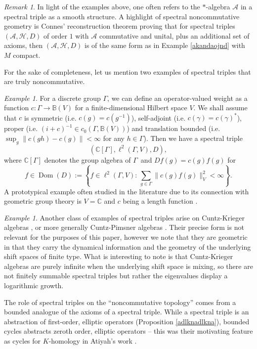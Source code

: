 \documentclass[a4paper,reqno]{amsart}
\numberwithin{equation}{section}
\def\Dom{\operatorname{Dom}}
\def\sup{\operatorname{sup}}
\def\C{\mathbb{C}}
\theoremstyle{definition}
\theoremstyle{remark}
\newtheorem{remark}[thm]{Remark}
\newtheorem{example}[thm]{Example}
\begin{document}
\begin{remark}
In light of the examples above, one often refers to the $*$-algebra $\mathcal{A}$ in a spectral triple as a smooth structure. A highlight of spectral noncommutative geometry is Connes' reconstruction theorem \cite{connesreconstr,renniereconst} proving that for spectral triples $(\mathcal{A},\mathcal{H},D)$ of order $1$ with $\mathcal{A}$ commutative and unital, plus an additional set of axioms, then $(\mathcal{A},\mathcal{H},D)$ is of the same form as in Example \ref{akandaojnd} with $M$ compact.
\end{remark}


For the sake of completeness, let us mention two examples of spectral triples that are truly noncommutative. 




\begin{example}
For a discrete group $\Gamma$, we can define an operator-valued weight as a function $c:\Gamma\to \mathbb{B}(V)$ for a finite-dimensional Hilbert space $V$. We shall assume that $c$ is symmetric (i.e. $c(g)=c(g^{-1})$), self-adjoint (i.e. $c(\gamma)=c(\gamma)^*$), proper (i.e. $(i+c)^{-1}\in c_0(\Gamma,\mathbb{B}(V))$) and translation bounded (i.e. $\sup_g\|c(gh)-c(g)\|<\infty$ for any $h\in \Gamma$). Then we have a spectral triple 
$$(\C[\Gamma],\ell^2(\Gamma,V),D),$$
where $\C[\Gamma]$ denotes the group algebra of $\Gamma$ and $Df(g)=c(g)f(g)$ for 
$$f\in \Dom(D):=\left\{f\in \ell^2(\Gamma,V): \, \sum_{g\in \Gamma} \|c(g)f(g)\|_V^2<\infty\right\}.$$
A prototypical example often studied in the literature due to its connection with geometric group theory is $V=\C$ and $c$ being a length function \cite{ConnesETDS, GRU,adathesis}.
\end{example}


\begin{example}
Another class of examples of spectral triples arise on Cuntz-Krieger algebras \cite{GM15}, or more generally Cuntz-Pimsner algebras \cite{GMR}. Their precise form is not relevant for the purposes of this paper, however we note that they are geometric in that they carry the dynamical information and the geometry of the underlying shift spaces of finite type. What is interesting to note is that Cuntz-Krieger algebras are purely infinite when the underlying shift space is mixing, so there are not finitely summable spectral triples but rather the eigenvalues display a logarithmic growth.
\end{example}


The role of spectral triples on the ``noncommutative topology'' comes from a bounded analogue of the axioms of a spectral triple. While a spectral triple is an abstraction of first-order, elliptic operators (Proposition \ref{adlknadlkna}), bounded cycles abstracts zeroth order, elliptic operators -- this was their motivating feature as cycles for $K$-homology in Atiyah's work \cite{atiyah70}.
\end{document}
